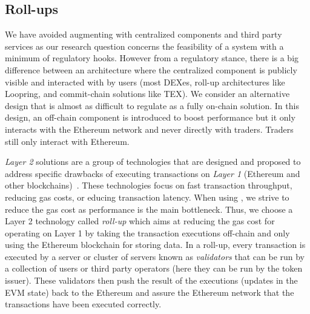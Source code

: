 \subsection{Roll-ups}

We have avoided augmenting \cm with centralized components and third party services as our research question concerns the feasibility of a system with a minimum of regulatory hooks. However from a regulatory stance, there is a big difference between an architecture where the centralized component is publicly visible and interacted with by users (\eg most DEXes, roll-up architectures like Loopring, and commit-chain solutions like TEX). We consider an alternative design that is almost as difficult to regulate as a fully on-chain solution. In this design, an off-chain component is introduced to boost performance but it only interacts with the Ethereum network and never directly with traders. Traders still only interact with Ethereum.


\textit{Layer 2} solutions are a group of technologies that are designed and proposed to address specific drawbacks of executing transactions on \textit{Layer 1} (\ie Ethereum and other blockchains)~\cite{gudgeon2020sok}. These technologies focus on fast transaction throughput, reducing gas costs, or educing transaction latency. When using \cm, we strive to reduce the gas cost as performance is the main bottleneck. Thus, we choose a Layer 2 technology called \textit{roll-up} which aims at reducing the gas cost for operating on Layer 1 by taking the transaction executions off-chain and only using the Ethereum blockchain for storing data. In a roll-up, every transaction is executed by a server or cluster of servers known as \textit{validators} that can be run by a collection of users or third party operators (here they can be run by the token issuer). These validators then push the result of the executions (\ie updates in the EVM state) back to the Ethereum and assure the Ethereum network that the transactions have been executed correctly.


